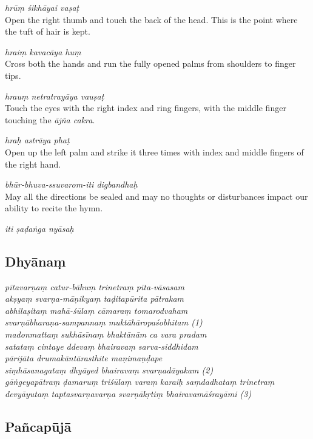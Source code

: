 \documentclass[11pt,oneside,a4paper]{article}
\newenvironment{shloka}[1]
  {\bigskip\center#1\varwidth{\linewidth}}
  {\endvarwidth\endcenter\bigskip}
\newcommand{\tl}[1]{\emph{#1}}
\begin{document}
\tl{hrūṃ śikhāyai vaṣaṭ}\\
Open the right thumb and touch the back of the head. This is the point where
the tuft of hair is kept.

\tl{hraiṃ kavacāya huṃ}\\
Cross both the hands and run the fully opened palms from shoulders to
finger tips.

\tl{hrauṃ netratrayāya vauṣaṭ}\\
Touch the eyes with the right index and ring fingers, with the middle finger
touching the \tl{ājña cakra}.

\tl{hraḥ astrāya phaṭ}\\
Open up the left palm and strike it three times with index and middle fingers
of the right hand.

\tl{bhūr-bhuva-ssuvarom-iti digbandhaḥ}\\
May all the directions be sealed and may no thoughts or disturbances impact our
ability to recite the hymn.

\begin{shloka}\itshape
  iti ṣaḍaṅga nyāsaḥ
\end{shloka}

\subsection{Dhyānaṃ}

\begin{shloka}\itshape
pītavarṇaṃ catur-bāhuṃ trinetraṃ pīta-vāsasam\\
akṣyaṃ svarṇa-māṇikyaṃ taḍitapūrita pātrakam\\
abhilaṣitaṃ mahā-śūlaṃ cāmaraṃ tomarodvaham\\
svarṇābharaṇa-sampannaṃ muktāhāropaśobhitam (1)\\

madonmattaṃ sukhāsīnaṃ bhaktānām ca vara pradam\\
satataṃ cintaye ddevaṃ bhairavaṃ sarva-siddhidam\\
pārijāta drumakāntārasthite maṇimaṇḍape\\
siṃhāsanagataṃ dhyāyed bhairavaṃ svarṇadāyakam (2)\\

gāṅgeyapātraṃ ḍamaruṃ triśūlaṃ varaṃ karaiḥ saṃdadhataṃ trinetraṃ\\
devyāyutaṃ taptasvarṇavarṇa svarṇākṛtiṃ bhairavamāśrayāmi (3)
\end{shloka}

\subsection{Pañcapūjā}
\end{document}

